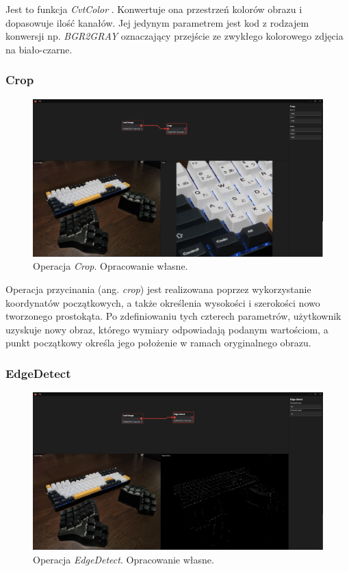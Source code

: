 Jest to funkcja \textit{CvtColor} \cite{cvtcol}. Konwertuje ona przestrzeń kolorów obrazu i dopasowuje ilość kanałów.
Jej jedynym parametrem jest kod z rodzajem konwersji np. \textit{BGR2GRAY} oznaczający przejście ze zwykłego kolorowego zdjęcia na biało-czarne.

\subsubsection{Crop}

\begin{figure}[H]
    \centering
    \includegraphics[width=1\linewidth]{images/Picture24.jpg}
    \caption{Operacja \textit{Crop}. Opracowanie własne.}
    \label{fig:crop}
\end{figure}

Operacja przycinania (ang. \textit{crop}) jest realizowana poprzez wykorzystanie koordynatów początkowych, a także określenia wysokości i szerokości nowo tworzonego prostokąta. Po zdefiniowaniu tych czterech parametrów, użytkownik uzyskuje nowy obraz, którego wymiary odpowiadają podanym wartościom, a punkt początkowy określa jego położenie w ramach oryginalnego obrazu.

\subsubsection{EdgeDetect}

\begin{figure}[H]
    \centering
    \includegraphics[width=1\linewidth]{images/Picture25.jpg}
    \caption{Operacja \textit{EdgeDetect}. Opracowanie własne.}
    \label{fig:edgeDetect}
\end{figure}  

